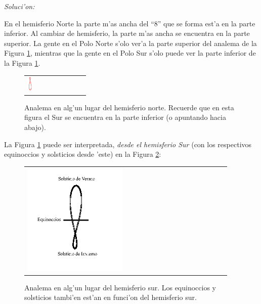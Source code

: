 \documentclass{article}
\begin{document}
\emph{Soluci'on:}

En el hemisferio Norte la parte m'as ancha del ``8'' que se forma est'a en la parte inferior. Al cambiar de hemisferio, la parte m'as ancha se encuentra en la parte superior. La gente en el Polo Norte s'olo ver'a la parte superior del analema de la Figura \ref{Analema}, mientras que la gente en el Polo Sur s'olo puede ver la parte inferior de la Figura \ref{Analema}.

\begin{figure}[!ht]
\begin{center}
\begin{tabular}{ll}
  \includegraphics[width=0.1\textwidth]{Analema.png}
\end{tabular}
\caption{Analema en alg'un lugar del hemisferio norte. Recuerde que en esta figura el Sur se encuentra en la parte inferior (o apuntando hacia abajo).}\label{Analema}
\end{center} 
\end{figure}

La Figura  \ref{Analema} puede ser interpretada, \emph{desde el hemisferio Sur} (con los respectivos equinoccios y solsticios desde 'este) en la Figura \ref{Analema_explained}:

\begin{figure}[!ht]
\begin{center}
\begin{tabular}{ll}
  \includegraphics[width=0.5\textwidth]{Analema_explained.png}
\end{tabular}
\caption{Analema en alg'un lugar del hemisferio sur. Los equinoccios y solsticios tambi'en est'an en funci'on del hemisferio sur.}\label{Analema_explained}
\end{center} 
\end{figure}
\end{document}
